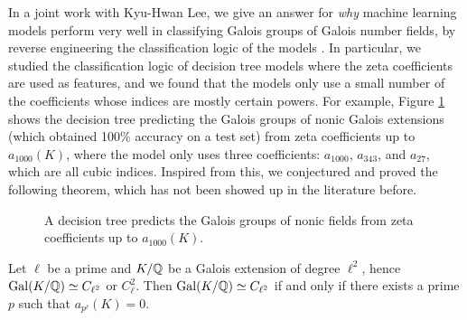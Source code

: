 \documentclass[letterpaper, 10pt]{article}
\begin{document}
In a joint work with Kyu-Hwan Lee, we give an answer for \emph{why} machine learning models perform very well in classifying Galois groups of Galois number fields, by reverse engineering the classification logic of the models \cite{lee2025machines}.
In particular, we studied the classification logic of decision tree models where the zeta coefficients are used as features, and we found that the models only use a small number of the coefficients whose indices are mostly certain powers.
For example, Figure \ref{fig:nonic_zeta_dt} shows the decision tree predicting the Galois groups of nonic Galois extensions (which obtained 100\% accuracy on a test set) from zeta coefficients up to $a_{1000}(K)$, where the model only uses three coefficients: $a_{1000}$, $a_{343}$, and $a_{27}$, which are all cubic indices.
Inspired from this, we conjectured and proved the following theorem, which has not been showed up in the literature before.

\begin{figure}[t]
    \centering
    \footnotesize
    \caption{A decision tree predicts the Galois groups of nonic fields from zeta coefficients up to $a_{1000}(K)$.}
    \label{fig:nonic_zeta_dt}
\end{figure}

\begin{theorem*}[Lee--L.]
\label{thm:ellsqzeta}
    Let $\ell$ be a prime and $K / \mathbb{Q}$ be a Galois extension of degree $\ell^2$, hence $\mathrm{Gal}(K/\mathbb{Q}) \simeq C_{\ell^2}$ or $C_{\ell}^2$.
    Then $\mathrm{Gal}(K / \mathbb{Q}) \simeq C_{\ell^2}$ if and only if there exists a prime $p$ such that $a_{p^\ell}(K) = 0$.
\end{theorem*}
\end{document}
